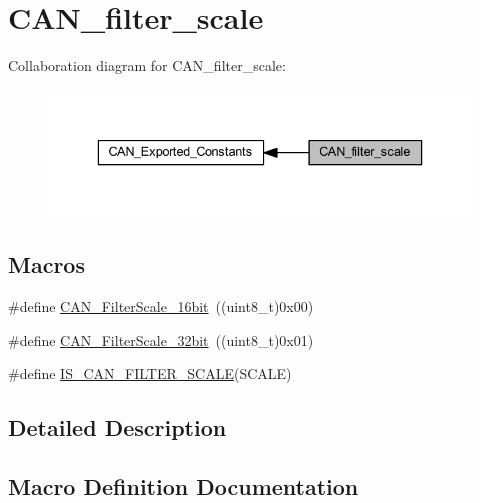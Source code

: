 \hypertarget{group___c_a_n__filter__scale}{}\section{C\+A\+N\+\_\+filter\+\_\+scale}
\label{group___c_a_n__filter__scale}
Collaboration diagram for C\+A\+N\+\_\+filter\+\_\+scale\+:
\nopagebreak
\begin{figure}[H]
\begin{center}
\leavevmode
\includegraphics[width=336pt]{group___c_a_n__filter__scale}
\end{center}
\end{figure}
\subsection*{Macros}
\begin{DoxyCompactItemize}
\item 
\#define \hyperlink{group___c_a_n__filter__scale_ga9e0493937e73bcf9a4127eef2f255a95}{C\+A\+N\+\_\+\+Filter\+Scale\+\_\+16bit}~((uint8\+\_\+t)0x00)
\item 
\#define \hyperlink{group___c_a_n__filter__scale_gac63dfb0e11713c59268ee9f4aebab60e}{C\+A\+N\+\_\+\+Filter\+Scale\+\_\+32bit}~((uint8\+\_\+t)0x01)
\item 
\#define \hyperlink{group___c_a_n__filter__scale_gaf64c93166af0eb5ec7e804116f10783a}{I\+S\+\_\+\+C\+A\+N\+\_\+\+F\+I\+L\+T\+E\+R\+\_\+\+S\+C\+A\+LE}(S\+C\+A\+LE)
\end{DoxyCompactItemize}


\subsection{Detailed Description}


\subsection{Macro Definition Documentation}
\mbox{\label{group___c_a_n__filter__scale_ga9e0493937e73bcf9a4127eef2f255a95}} 
